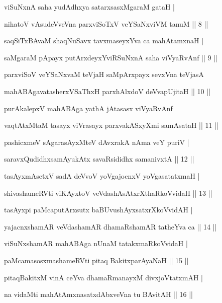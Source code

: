 \documentclass{article}
\begin{document}
  
\begin{sl}
 viSuNxnA  saha  yudAdhxya  satarxsasxMgaraM  gataH |
 
 nihatoV  vAsudeVveVna  parxviSoTxV  veYSaNxviVM  tanuM       ||   8   ||
\end{sl}  
  
  
\begin{sl}
 saqSiTxBAvaM  shaqNuSavx  tavxmaseyxYva  ca  mahAtamxnaH |
 
 saMgaraM  pApayx  putArxdeyxYviRSuNxnA  saha  viVyaRvAnf     ||   9   ||   
\end{sl}  

  
\begin{sl}
 parxviSoV  veYSaNxvaM  teVjaH  saMpArxpayx  sevxVna  teVjasA 
 
 mahABAgavatasherxVSaThxH  parxhAlxdoV  deVvapUjitaH         ||   10   ||
\end{sl}  
  
  
\begin{sl}
 purAkalepxV  mahABAga  yathA  jAtasasx  viVyaRvAnf
 
 vaqtAtxMtaM  tasayx  viVrasayx  parxvakASxyXmi  samAsataH   ||   11   ||
\end{sl}  
  
  
\begin{sl}
 pashicxmeV  sAgarasAyxMteV  dAvxrakA  nAma  veY  puriV |
 
 saravxQudidhxsamAyukAtx  savaRsididhx samanivxtA            ||   12   ||
\end{sl}  
  
  
\begin{sl}
 tasAyxmAsetxV  sadA  deVvoV  yoVgajocnxV  yoVgasatatxmaH |
 
 shivashameRVti  viKAyxtoV  veVdashAsAtxrXthaRkoVvidaH       ||   13   ||
\end{sl}  
  
  
\begin{sl}
 tasAyxpi  paMcaputArxsutx  baBUvushAyxsatxrXkoVvidAH |
 
 yajacnxshamAR  veVdashamAR  dhamaRshamAR  tatheYva  ca      ||   14   ||   
\end{sl}  
  
  
\begin{sl}
 viSuNxshamAR  mahABAga  nUnaM  tatakxmaRkoVvidaH |
 
 paMcamasosxmashameRVti  pitaq BakitxparAyaNaH               ||   15   ||
\end{sl}  
  
  
\begin{sl}
 pitaqBakitxM  vinA  ceYva  dhamaRmanayxM  divxjoVtatxmAH |
 
 na vidaMti  mahAtAmxnasatxdAbxveVna  tu  BAvitAH            ||    16   ||
\end{sl}  
  
\end{document}
